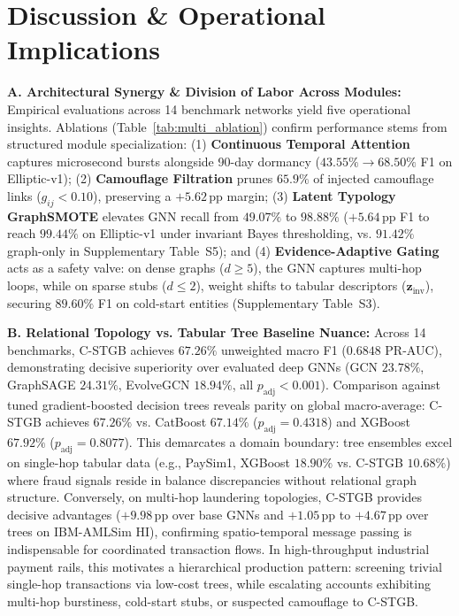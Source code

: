 \section{Discussion \& Operational Implications}
\label{sec:discussion}
\noindent\textbf{A. Architectural Synergy \& Division of Labor Across Modules:}
Empirical evaluations across 14 benchmark networks yield five operational insights. Ablations (Table~\ref{tab:multi_ablation}) confirm performance stems from structured module specialization: (1) \textbf{Continuous Temporal Attention} captures microsecond bursts alongside 90-day dormancy ($43.55\% \to 68.50\%$ F1 on Elliptic-v1); (2) \textbf{Camouflage Filtration} prunes $65.9\%$ of injected camouflage links ($g_{ij} < 0.10$), preserving a $+5.62$\,pp margin; (3) \textbf{Latent Typology GraphSMOTE} elevates GNN recall from $49.07\%$ to $98.88\%$ ($+5.64$\,pp F1 to reach $99.44\%$ on Elliptic-v1 under invariant Bayes thresholding, vs. $91.42\%$ graph-only in Supplementary Table~S5); and (4) \textbf{Evidence-Adaptive Gating} acts as a safety valve: on dense graphs ($d \ge 5$), the GNN captures multi-hop loops, while on sparse stubs ($d \le 2$), weight shifts to tabular descriptors ($\mathbf{z}_{\text{inv}}$), securing $89.60\%$ F1 on cold-start entities (Supplementary Table~S3).

\noindent\textbf{B. Relational Topology vs. Tabular Tree Baseline Nuance:}
Across 14 benchmarks, C-STGB achieves $67.26\%$ unweighted macro F1 ($0.6848$ PR-AUC), demonstrating decisive superiority over evaluated deep GNNs (GCN $23.78\%$, GraphSAGE $24.31\%$, EvolveGCN $18.94\%$, all $p_{\text{adj}} < 0.001$). Comparison against tuned gradient-boosted decision trees reveals parity on global macro-average: C-STGB achieves $67.26\%$ vs. CatBoost $67.14\%$ ($p_{\text{adj}}=0.4318$) and XGBoost $67.92\%$ ($p_{\text{adj}}=0.8077$). This demarcates a domain boundary: tree ensembles excel on single-hop tabular data (e.g., PaySim1, XGBoost $18.90\%$ vs. C-STGB $10.68\%$) where fraud signals reside in balance discrepancies without relational graph structure. Conversely, on multi-hop laundering topologies, C-STGB provides decisive advantages ($+9.98$\,pp over base GNNs and $+1.05$\,pp to $+4.67$\,pp over trees on IBM-AMLSim HI), confirming spatio-temporal message passing is indispensable for coordinated transaction flows. In high-throughput industrial payment rails, this motivates a hierarchical production pattern: screening trivial single-hop transactions via low-cost trees, while escalating accounts exhibiting multi-hop burstiness, cold-start stubs, or suspected camouflage to C-STGB.

